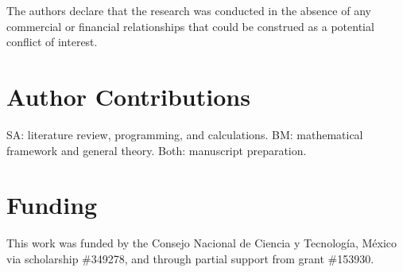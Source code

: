 \documentclass[utf8]{frontiersSCNS}
\begin{document}
The authors declare that the research was conducted in the absence of any
commercial or financial relationships that could be construed as a potential
conflict of interest.


\section*{Author Contributions}

SA: literature review, programming, and calculations. BM: mathematical framework
and general theory. Both: manuscript preparation.


\section*{Funding}
This work was funded by the Consejo Nacional de Ciencia y Tecnolog\'ia, M\'exico
via scholarship \#349278, and through partial support from grant \#153930.



\end{document}
